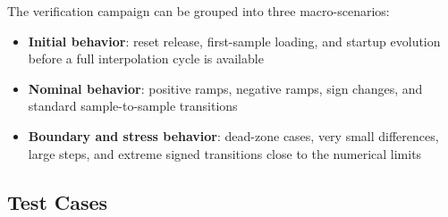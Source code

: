 \documentclass[a4paper,11pt]{article}
\begin{document}
The verification campaign can be grouped into three macro-scenarios:
\begin{itemize}
    \item \textbf{Initial behavior}: reset release, first-sample loading, and startup evolution before a full interpolation cycle is available
    \item \textbf{Nominal behavior}: positive ramps, negative ramps, sign changes, and standard sample-to-sample transitions
    \item \textbf{Boundary and stress behavior}: dead-zone cases, very small differences, large steps, and extreme signed transitions close to the numerical limits
\end{itemize}

\subsection{Test Cases}
\end{document}

